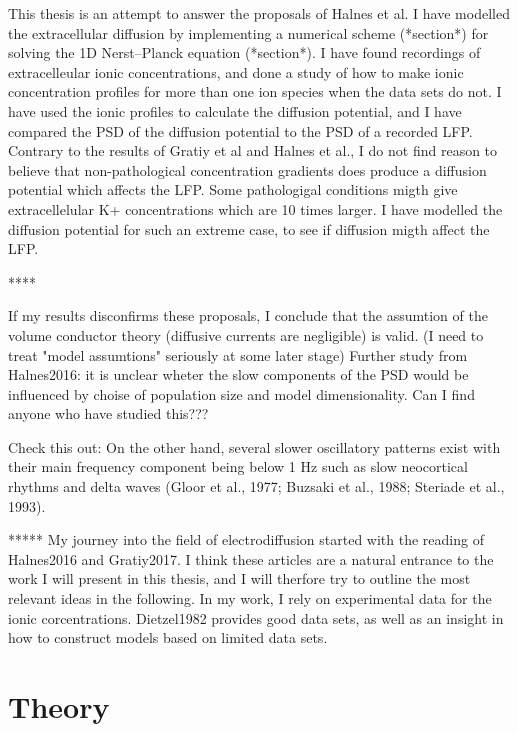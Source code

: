 \documentclass{article}
\begin{document}
This thesis is an attempt to answer the proposals of Halnes et al. I have modelled the extracellular diffusion by implementing a numerical scheme (*section*) for solving the 1D  Nerst--Planck equation (*section*). I have found recordings of extracelleular ionic concentrations, and done a study of how to make ionic concentration profiles for more than one ion species when the data sets do not. I have used the ionic profiles to calculate the diffusion potential, and I have compared the PSD of the diffusion potential to the PSD of a recorded LFP. Contrary to the results of Gratiy et al and Halnes et al., I do not find reason to believe that non-pathological concentration gradients does produce a diffusion potential which affects the LFP. Some pathologigal conditions migth give extracellelular K+ concentrations which are 10 times larger. I have modelled the diffusion potential for such an extreme case, to see if diffusion migth affect the LFP. 



****



If my results disconfirms these proposals, I conclude that the assumtion of the volume conductor theory (diffusive currents are negligible) is valid. 
(I need to treat "model assumtions" seriously at some later stage)
Further study from Halnes2016: it is unclear wheter the slow components of the PSD would be influenced by choise of population size and model dimensionality. Can I find anyone who have studied this???

Check this out: On the
other hand, several slower oscillatory patterns exist with their main
frequency component being below 1 Hz such as slow neocortical
rhythms and delta waves (Gloor et al., 1977; Buzsaki et al., 1988;
Steriade et al., 1993).


*****
My journey into the field of electrodiffusion started with the reading of Halnes2016 and Gratiy2017. I think these articles are a natural entrance to the work I will present in this thesis, and I will therfore try to outline the most relevant ideas in the following. In my work, I rely on experimental data for the ionic corcentrations. Dietzel1982 provides good data sets, as well as an insight in how to construct models based on limited data sets. 


\section{Theory}
\end{document}

